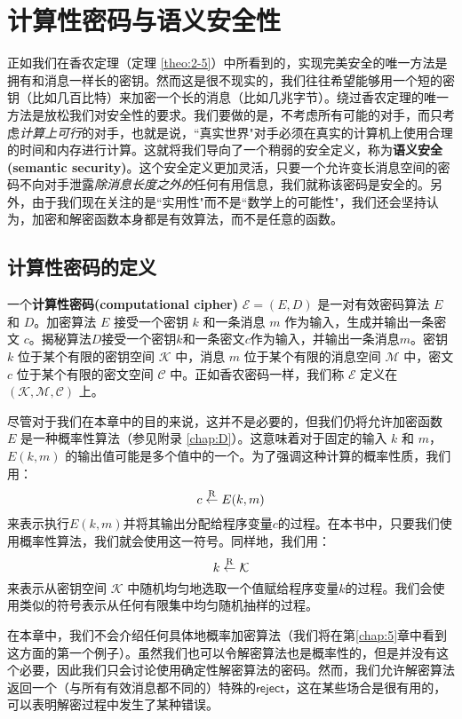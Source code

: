 \section{计算性密码与语义安全性}

正如我们在香农定理（定理 \ref{theo:2-5}）中所看到的，实现完美安全的唯一方法是拥有和消息一样长的密钥。然而这是很不现实的，我们往往希望能够用一个短的密钥（比如几百比特）来加密一个长的消息（比如几兆字节）。绕过香农定理的唯一方法是放松我们对安全性的要求。我们要做的是，不考虑所有可能的对手，而只考虑\emph{计算上可行}的对手，也就是说，``真实世界"对手必须在真实的计算机上使用合理的时间和内存进行计算。这就将我们导向了一个稍弱的安全定义，称为\textbf{语义安全(semantic security)}。这个安全定义更加灵活，只要一个允许变长消息空间的密码不向对手泄露\emph{除消息长度之外的}任何有用信息，我们就称该密码是安全的。另外，由于我们现在关注的是``实用性"而不是``数学上的可能性"，我们还会坚持认为，加密和解密函数本身都是有效算法，而不是任意的函数。

\subsection{计算性密码的定义}\label{subsec:2-2-1}

一个\textbf{计算性密码(computational cipher)} $\mathcal{E}=(E,D)$ 是一对有效密码算法 $E$ 和 $D$。加密算法 $E$ 接受一个密钥 $k$ 和一条消息 $m$ 作为输入，生成并输出一条密文 $c$。揭秘算法$D$接受一个密钥$k$和一条密文$c$作为输入，并输出一条消息$m$。密钥 $k$ 位于某个有限的密钥空间 $\mathcal{K}$ 中，消息 $m$ 位于某个有限的消息空间 $\mathcal{M}$ 中，密文 $c$ 位于某个有限的密文空间 $\mathcal{C}$ 中。正如香农密码一样，我们称 $\mathcal{E}$ 定义在 $(\mathcal{K},\mathcal{M},\mathcal{C})$ 上。

尽管对于我们在本章中的目的来说，这并不是必要的，但我们仍将允许加密函数 $E$ 是一种概率性算法（参见附录 \ref{chap:D}）。这意味着对于固定的输入 $k$ 和 $m$，$E(k,m)$ 的输出值可能是多个值中的一个。为了强调这种计算的概率性质，我们用：
\[
c\overset{\rm R}\leftarrow E(k,m)
\]
来表示执行$E(k,m)$并将其输出分配给程序变量$c$的过程。在本书中，只要我们使用概率性算法，我们就会使用这一符号。同样地，我们用：
\[
k\overset{\rm R}\leftarrow\mathcal{K}
\]
来表示从密钥空间 $\mathcal{K}$ 中随机均匀地选取一个值赋给程序变量$k$的过程。我们会使用类似的符号表示从任何有限集中均匀随机抽样的过程。

在本章中，我们不会介绍任何具体地概率加密算法（我们将在第\ref{chap:5}章中看到这方面的第一个例子）。虽然我们也可以令解密算法也是概率性的，但是并没有这个必要，因此我们只会讨论使用确定性解密算法的密码。然而，我们允许解密算法返回一个（与所有有效消息都不同的）特殊的$\mathsf{reject}$，这在某些场合是很有用的，可以表明解密过程中发生了某种错误。

